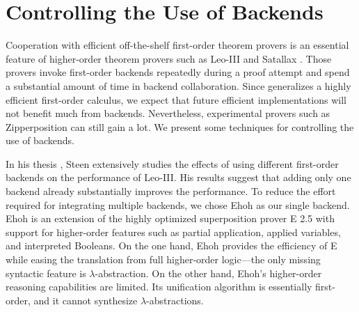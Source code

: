 \documentclass[smallcondensed,draft]{svjour3}     %
\begin{document}


\section{Controlling the Use of Backends}
\label{sec:ho-tech:backends}

\newcommand{\ParamNumClauses}{\ensuremath{K_\mathrm{size}}}
\newcommand{\ParamTime}{\ensuremath{K_\mathrm{time}}}

Cooperation with efficient off-the-shelf first-order theorem provers is an
essential feature of higher-order theorem provers such as Leo-III
\cite[Sect.~4.4]{as-18-phd} and Satallax \cite{cb-2013-satallax}.
Those provers invoke first-order backends repeatedly
during a proof attempt and spend a substantial amount of time in backend
collaboration. Since \lsup{} generalizes a highly efficient
first-order calculus, we expect that future efficient \lsup{}
implementations will not benefit much from backends.
Nevertheless, experimental provers such
as Zipperposition can still gain a lot. We present some
techniques for controlling the use of backends.

In his thesis \cite[Sect.~6.1]{as-18-phd}, Steen extensively studies
the effects of using different first-order backends on the performance of
Leo-III. His results suggest that adding only one backend already substantially
improves the performance. To reduce the effort required for integrating multiple backends, we chose Ehoh \cite{ehoh-section} as our single
backend. Ehoh is an extension of the highly optimized superposition prover E 2.5
with support for higher-order features such as partial
application, applied variables, and interpreted Booleans.
On the one hand, Ehoh provides the efficiency of E while easing the translation from full
higher-order logic---the only missing syntactic feature is
$\lambda$-abstraction. On the other hand, Ehoh's higher-order reasoning
capabilities are limited. Its unification algorithm is essentially first-order,
and it cannot synthesize $\lambda$-abstractions.
\end{document}
